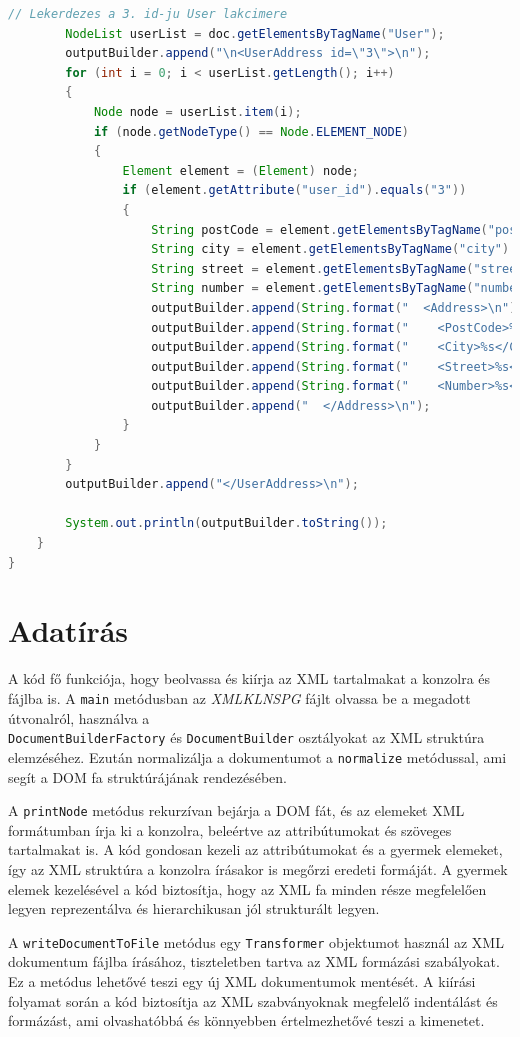 \documentclass[12pt]{report}
\begin{document}
\begin{lstlisting}[caption={DOMQueryKLNSPG.java} adatlekérdező program, language=Java]
		// Lekerdezes a 3. id-ju User lakcimere
		NodeList userList = doc.getElementsByTagName("User");
		outputBuilder.append("\n<UserAddress id=\"3\">\n");
		for (int i = 0; i < userList.getLength(); i++) 
		{
			Node node = userList.item(i);
			if (node.getNodeType() == Node.ELEMENT_NODE) 
			{
				Element element = (Element) node;
				if (element.getAttribute("user_id").equals("3")) 
				{
					String postCode = element.getElementsByTagName("post_code").item(0).getTextContent();
					String city = element.getElementsByTagName("city").item(0).getTextContent();
					String street = element.getElementsByTagName("street").item(0).getTextContent();
					String number = element.getElementsByTagName("number").item(0).getTextContent();
					outputBuilder.append(String.format("  <Address>\n"));
					outputBuilder.append(String.format("    <PostCode>%s</PostCode>\n", postCode));
					outputBuilder.append(String.format("    <City>%s</City>\n", city));
					outputBuilder.append(String.format("    <Street>%s</Street>\n", street));
					outputBuilder.append(String.format("    <Number>%s</Number>\n", number));
					outputBuilder.append("  </Address>\n");
				}
			}
		}
		outputBuilder.append("</UserAddress>\n");
		
		System.out.println(outputBuilder.toString());
	}
}
\end{lstlisting}

\section{Adatírás}
\indent\indent A kód fő funkciója, hogy beolvassa és kiírja az XML tartalmakat a konzolra és fájlba is. A \texttt{main} metódusban az \textit{XMLKLNSPG} fájlt olvassa be a megadott útvonalról, használva a \\ \texttt{DocumentBuilderFactory} és \texttt{DocumentBuilder} osztályokat az XML struktúra elemzéséhez. Ezután normalizálja a dokumentumot a \texttt{normalize} metódussal, ami segít a DOM fa struktúrájának rendezésében.

A \texttt{printNode} metódus rekurzívan bejárja a DOM fát, és az elemeket XML formátumban írja ki a konzolra, beleértve az attribútumokat és szöveges tartalmakat is. A kód gondosan kezeli az attribútumokat és a gyermek elemeket, így az XML struktúra a konzolra írásakor is megőrzi eredeti formáját. A gyermek elemek kezelésével a kód biztosítja, hogy az XML fa minden része megfelelően legyen reprezentálva és hierarchikusan jól strukturált legyen.

A \texttt{writeDocumentToFile} metódus egy \texttt{Transformer} objektumot használ az XML dokumentum fájlba írásához, tiszteletben tartva az XML formázási szabályokat. Ez a metódus lehetővé teszi egy új XML dokumentumok mentését. A kiírási folyamat során a kód biztosítja az XML szabványoknak megfelelő indentálást és formázást, ami olvashatóbbá és könnyebben értelmezhetővé teszi a kimenetet.
\end{document}

